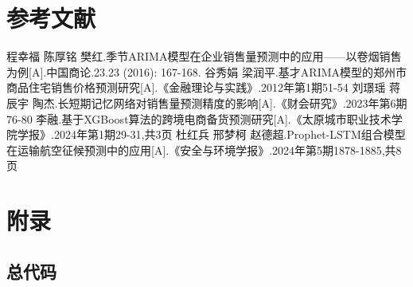 \documentclass[a4paper]{article}
\begin{document}
\section{参考文献}
\begin{thebibliography}{9}
	程幸福 \hspace{2pt}陈厚铭 \hspace{2pt}樊红.季节ARIMA模型在企业销售量预测中的应用——以卷烟销售为例[A].中国商论.23.23 (2016): 167-168.
	谷秀娟 \hspace{2pt}梁润平.基才ARIMA模型的郑州市商品住宅销售价格预测研究[A].《金融理论与实践》.2012年第1期51-54
	刘璟瑶 \hspace{2pt}蒋辰宇 \hspace{2pt}陶杰.长短期记忆网络对销售量预测精度的影响[A].《财会研究》.2023年第6期76-80
	李融.基于XGBoost算法的跨境电商备货预测研究[A].《太原城市职业技术学院学报》.2024年第1期29-31,共3页
	杜红兵 \hspace{2pt}邢梦柯 \hspace{2pt}赵德超.Prophet-LSTM组合模型在运输航空征候预测中的应用[A].《安全与环境学报》.2024年第5期1878-1885,共8页
\end{thebibliography}
\newpage %

\section{附录}
\subsection{总代码}
\end{document}
